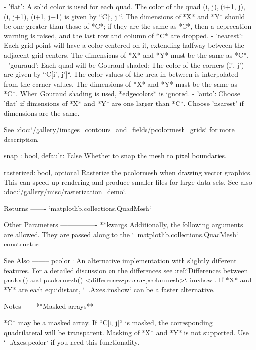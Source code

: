 \begin{DoxyVerb}
\begin{DoxyVerb}
    - 'flat': A solid color is used for each quad. The color of the
      quad (i, j), (i+1, j), (i, j+1), (i+1, j+1) is given by
      ``C[i, j]``. The dimensions of *X* and *Y* should be
      one greater than those of *C*; if they are the same as *C*,
      then a deprecation warning is raised, and the last row
      and column of *C* are dropped.
    - 'nearest': Each grid point will have a color centered on it,
      extending halfway between the adjacent grid centers.  The
      dimensions of *X* and *Y* must be the same as *C*.
    - 'gouraud': Each quad will be Gouraud shaded: The color of the
      corners (i', j') are given by ``C[i', j']``. The color values of
      the area in between is interpolated from the corner values.
      The dimensions of *X* and *Y* must be the same as *C*. When
      Gouraud shading is used, *edgecolors* is ignored.
    - 'auto': Choose 'flat' if dimensions of *X* and *Y* are one
      larger than *C*.  Choose 'nearest' if dimensions are the same.

    See :doc:`/gallery/images_contours_and_fields/pcolormesh_grids`
    for more description.

snap : bool, default: False
    Whether to snap the mesh to pixel boundaries.

rasterized: bool, optional
    Rasterize the pcolormesh when drawing vector graphics.  This can
    speed up rendering and produce smaller files for large data sets.
    See also :doc:`/gallery/misc/rasterization_demo`.

Returns
-------
`matplotlib.collections.QuadMesh`

Other Parameters
----------------
**kwargs
    Additionally, the following arguments are allowed. They are passed
    along to the `~matplotlib.collections.QuadMesh` constructor:


See Also
--------
pcolor : An alternative implementation with slightly different
    features. For a detailed discussion on the differences see
    :ref:`Differences between pcolor() and pcolormesh()
    <differences-pcolor-pcolormesh>`.
imshow : If *X* and *Y* are each equidistant, `~.Axes.imshow` can be a
    faster alternative.

Notes
-----
**Masked arrays**

*C* may be a masked array. If ``C[i, j]`` is masked, the corresponding
quadrilateral will be transparent. Masking of *X* and *Y* is not
supported. Use `~.Axes.pcolor` if you need this functionality.


\end{DoxyVerb}
\end{DoxyVerb}
